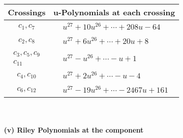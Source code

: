 \documentclass[1p]{elsarticle_modified}
\theoremstyle{definition}
\begin{document}
\begin{tabular}{m{50pt}|m{274pt}}
Crossings & \hspace{64pt}u-Polynomials at each crossing \\
\hline $$\begin{aligned}c_{1},c_{7}\end{aligned}$$&$\begin{aligned}
&u^{27}+10 u^{26}+\cdots+208 u-64
\end{aligned}$\\
\hline $$\begin{aligned}c_{2},c_{8}\end{aligned}$$&$\begin{aligned}
&u^{27}+6 u^{26}+\cdots+20 u+8
\end{aligned}$\\
\hline $$\begin{aligned}c_{3},c_{5},c_{9}\\c_{11}\end{aligned}$$&$\begin{aligned}
&u^{27}- u^{26}+\cdots- u+1
\end{aligned}$\\
\hline $$\begin{aligned}c_{4},c_{10}\end{aligned}$$&$\begin{aligned}
&u^{27}+2 u^{26}+\cdots- u-4
\end{aligned}$\\
\hline $$\begin{aligned}c_{6},c_{12}\end{aligned}$$&$\begin{aligned}
&u^{27}-19 u^{26}+\cdots-2467 u+161
\end{aligned}$\\
\hline
\end{tabular}\\~\\
\newpage\renewcommand{\arraystretch}{1}
\flushleft \textbf{(v) Riley Polynomials at the component}\newline \\
\end{document}
